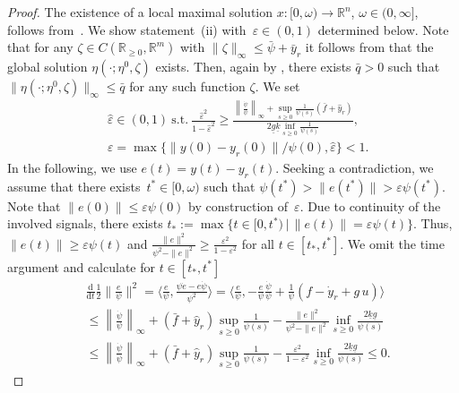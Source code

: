 \documentclass[journal,twoside,web]{ieeeconf}
\newcommand{\R}{\mathbb{R}}
\begin{document}
\begin{proof}
    The existence of a local maximal solution ${x: [0,\omega) \to \R^n}$, $\omega \in (0,\infty]$, follows from~\cite[Thm.~5]{IlchRyan02b}.
    We show statement~(ii) with~$\varepsilon \in (0,1)$ determined below. 
    Note that for any $\zeta \in C(\R_{\ge 0},\R^m)$ with $\|\zeta\|_\infty \le \bar \psi + \bar y_r$ it follows from  that the global solution $\eta(\cdot;\eta^0,\zeta)$ exists. Then, again by , there exists $\bar q>0$ such that  $\|\eta(\cdot;\eta^0,\zeta)\|_\infty \le \bar q$ for any such function $\zeta$. 
    We set
    \begin{align*}
               &\hat \varepsilon \in (0,1) \ \text{s.t.} \ \frac{\hat \varepsilon^2}{1- \hat \varepsilon^2} \ge \frac{ \left\|\tfrac{\dot \psi}{\psi}\right\|_\infty + \sup_{s \ge 0}\tfrac{1}{\psi(s)}(\bar f + \hat y_r) }{2\underline{g} \underline{k} \inf_{s \ge 0} \tfrac{1}{\psi(s)}}, \\
        & \varepsilon = \max \{ \|y(0) - y_r(0)\|/\psi(0), \hat \varepsilon \} < 1.
    \end{align*}
    In the following, we use $e(t)=y(t)-y_r(t)$.
    Seeking a contradiction, we assume that there exists~$t^* \in [0,\omega)$ such that $\psi(t^*) > \|e(t^*)\| > \varepsilon \psi(t^*)$.
    Note that $\|e(0)\| \le \varepsilon \psi(0)$ by construction of~$\varepsilon$.
    Due to continuity of the involved signals, there exists $t_* := \max\{ t \in [0,t^*) \, | \, \|e(t)\| = \varepsilon \psi(t) \}$. Thus, $\|e(t)\|\ge \varepsilon \psi(t)$ and $\tfrac{\|e\|^2}{\psi^2-\|e\|^2} \ge \tfrac{\varepsilon^2}{1-\varepsilon^2}$ for all $t\in [t_*,t^*]$.
    We omit the time argument and calculate for $t \in [t_*,t^*]$
    \begin{equation*}
        \begin{aligned}
           & \tfrac{\textrm{d}}{\textrm{d} t} \tfrac{1}{2} \| \tfrac{e}{\psi}\|^2 
            = \langle \tfrac{e}{\psi},  \tfrac{\psi \dot e - e \dot \psi}{\psi^2}  \rangle 
            = \langle  \tfrac{e}{\psi},  -\tfrac{e}{\psi} \tfrac{\dot \psi}{\psi} + \tfrac{1}{\psi} (f - \dot y_r + g\,u) \rangle \\
            & \le \left\| \tfrac{\dot \psi}{\psi} \right\|_\infty + (\bar f + \hat y_r) \sup_{s \ge 0} \tfrac{1}{\psi(s)} - \tfrac{\|e\|^2}{\psi^2-\|e\|^2} \inf_{s \ge 0} \tfrac{2\underline{k} \underline{g}}{\psi(s)}  \\
            &\le \left\| \tfrac{\dot \psi}{\psi} \right\|_\infty + (\bar f + \hat y_r) \sup_{s \ge 0} \tfrac{1}{\psi(s)} - \tfrac{\varepsilon^2}{1-\varepsilon^2} \inf_{s \ge 0} \tfrac{2\underline{k} \underline{g}}{\psi(s)}               \le 0.           

\end{aligned}
\end{equation*}
\end{proof}
\end{document}
